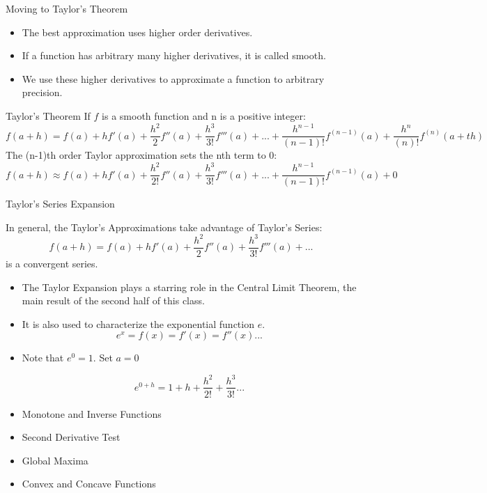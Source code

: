 \documentclass[aspectratio=169, handout]{beamer}
\numberwithin{equation}{section}
\begin{document}
\begin{frame}{Moving to Taylor's Theorem}
\begin{itemize}
\item The best approximation uses higher order derivatives.\pause
\item If a function has arbitrary many higher derivatives, it is called smooth.  \pause
\item We use these higher derivatives to approximate a function to arbitrary precision.
\end{itemize} 
\end{frame}

\begin{frame}{Taylor's Theorem}
If $f$ is a smooth function and n is a positive integer:
{\scriptsize
$$f(a+h)=f(a)+hf'(a)+\frac{h^2}{2}f''(a)+\frac{h^3}{3!}f'''(a)+...+\frac{h^{n-1}}{(n-1)!}f^{(n-1)}(a)+\frac{h^{n}}{(n)!}f^{(n)}(a+th)$$\pause
}
The (n-1)th order Taylor approximation sets the nth term to 0:
$$f(a+h)\approx f(a)+hf'(a)+\frac{h^2}{2!}f''(a)+\frac{h^3}{3!}f'''(a)+...+\frac{h^{n-1}}{(n-1)!}f^{(n-1)}(a)+0$$
 

\end{frame}

\begin{frame}{Taylor's Series Expansion}

In general, the Taylor's Approximations take advantage of Taylor's Series:
$$f(a+h)=f(a)+hf'(a)+\frac{h^2}{2}f''(a)+\frac{h^3}{3!}f'''(a)+...$$
is a convergent series.\pause
\begin{itemize}
\item The Taylor Expansion plays a starring role in the Central Limit Theorem, the main result of the second half of this class.\pause
\item It is also used to characterize the exponential function $e$.\pause
$$e^x=f(x)=f'(x)=f''(x)...$$\pause
\item[] Note that $e^0=1$.  Set $a=0$\pause

$$e^{0+h}=1+h+\frac{h^2}{2!}+\frac{h^3}{3!}...$$

\end{itemize}

\end{frame}



\begin{frame}

\begin{itemize}
\item \textcolor{myblack}{Monotone and Inverse Functions}
\item \textcolor{myblack}{Second Derivative Test}
\item \textcolor{myblack}{Global Maxima}
\item \textcolor{myblack}{Convex and Concave Functions}
\end{itemize}

\end{frame}
\end{document}

